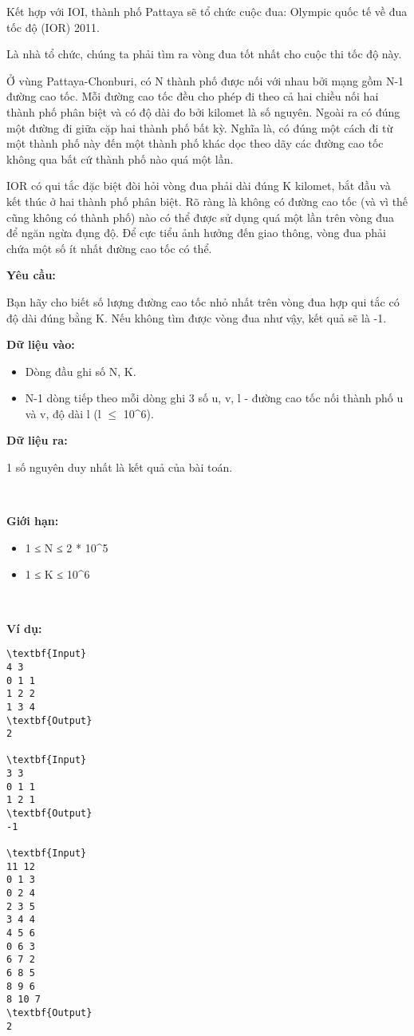 

Kết hợp với IOI, thành phố Pattaya sẽ tổ chức cuộc đua: Olympic quốc tế về đua tốc độ (IOR) 2011.

Là nhà tổ chức, chúng ta phải tìm ra vòng đua tốt nhất cho cuộc thi tốc độ này.

Ở vùng Pattaya-Chonburi, có N thành phố được nối với nhau bởi mạng gồm N-1 đường cao tốc. Mỗi đường cao tốc đều cho phép đi theo cả hai chiều nối hai thành phố phân biệt và có độ dài đo bởi kilomet là số nguyên. Ngoài ra có đúng một đường đi giữa cặp hai thành phố bất kỳ. Nghĩa là, có đúng một cách đi từ một thành phố này đến một thành phố khác dọc theo dãy các đường cao tốc không qua bất cứ thành phố nào quá một lần.

IOR có qui tắc đặc biệt đòi hỏi vòng đua phải dài đúng K kilomet, bắt đầu và kết thúc ở hai thành phố phân biệt. Rõ ràng là không có đường cao tốc (và vì thế cũng không có thành phố) nào có thể được sử dụng quá một lần trên vòng đua để ngăn ngừa đụng độ. Để cực tiểu ảnh hưởng đến giao thông, vòng đua phải chứa một số ít nhất đường cao tốc có thể.

\textbf{Yêu cầu: }

Bạn hãy cho biết số lượng đường cao tốc nhỏ nhất trên vòng đua hợp qui tắc có độ dài đúng bằng K. Nếu không tìm được vòng đua như vậy, kết quả sẽ là -1.

\textbf{Dữ liệu vào: }
\begin{itemize}
	\item Dòng đầu ghi số N, K.
	\item N-1 dòng tiếp theo mỗi dòng ghi 3 số u, v, l - đường cao tốc nối thành phố u và v, độ dài l (l  $\le$  10^6).
\end{itemize}

\textbf{Dữ liệu ra: }

1 số nguyên duy nhất là kết quả của bài toán.

 

\textbf{Giới hạn: }
\begin{itemize}
	\item 1 ≤ N ≤ 2 * 10^5
	\item 1 ≤ K ≤ 10^6
\end{itemize}

 

\textbf{Ví dụ: }
\begin{verbatim}
\textbf{Input}
4 3
0 1 1
1 2 2
1 3 4
\textbf{Output}
2

\textbf{Input}
3 3
0 1 1
1 2 1
\textbf{Output}
-1

\textbf{Input}
11 12
0 1 3
0 2 4
2 3 5
3 4 4
4 5 6
0 6 3
6 7 2
6 8 5
8 9 6
8 10 7
\textbf{Output}
2\end{verbatim}

 
